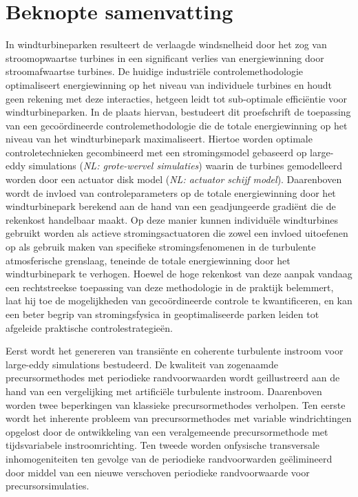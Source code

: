 \chapter*{Beknopte samenvatting}

In windturbineparken resulteert de verlaagde windsnelheid door het zog van stroomopwaartse turbines in een significant verlies van energiewinning door stroomafwaartse turbines. De huidige industri\"ele controlemethodologie optimaliseert energiewinning op het niveau van individuele turbines en houdt geen rekening met deze interacties, hetgeen leidt tot sub-optimale effici\"entie voor windturbineparken. In de plaats hiervan, bestudeert dit proefschrift de toepassing van een geco\"ordineerde controlemethodologie die de totale energiewinning op het niveau van het windturbinepark maximaliseert. Hiertoe worden optimale controletechnieken gecombineerd met een stromingsmodel gebaseerd op large-eddy simulations (\emph{NL: grote-wervel simulaties}) waarin de turbines gemodelleerd worden door een actuator disk model (\emph{NL: actuator schijf model}). Daarenboven wordt de invloed van controleparameters op de totale energiewinning door het windturbinepark berekend aan de hand van een geadjungeerde gradi\"ent die de rekenkost handelbaar maakt. Op deze manier kunnen individu\"ele windturbines gebruikt worden als actieve stromingsactuatoren die zowel een invloed uitoefenen op als gebruik maken van specifieke stromingsfenomenen in de turbulente atmosferische grenslaag, teneinde de totale energiewinning door het windturbinepark te verhogen. Hoewel de hoge rekenkost van deze aanpak vandaag een rechtstreekse toepassing van deze methodologie in de praktijk belemmert, laat hij toe de mogelijkheden van geco\"ordineerde controle te kwantificeren, en kan een beter begrip van stromingsfysica in geoptimaliseerde parken leiden tot afgeleide praktische controlestrategie\"en. 

Eerst wordt het genereren van transi\"ente en coherente turbulente instroom voor large-eddy simulations bestudeerd. De kwaliteit van zogenaamde precursormethodes met periodieke randvoorwaarden wordt geillustreerd aan de hand van een vergelijking met artifici\"ele turbulente instroom. Daarenboven worden twee beperkingen van klassieke precursormethodes verholpen. Ten eerste wordt het inherente probleem van precursormethodes met variable windrichtingen opgelost door de ontwikkeling van een veralgemeende precursormethode met tijdsvariabele instroomrichting. Ten tweede worden onfysische transversale inhomogeniteiten ten gevolge van de periodieke randvoorwarden ge\"elimineerd door middel van een nieuwe verschoven periodieke randvoorwaarde voor precursorsimulaties. 

